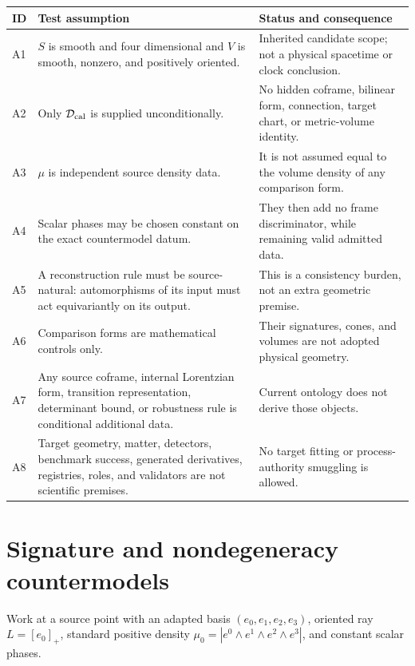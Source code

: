 \documentclass[11pt]{article}
\begin{document}
\begin{longtable}{>{\raggedright\arraybackslash}p{}
                  >{\raggedright\arraybackslash}p{}
                  >{\raggedright\arraybackslash}p{}}
\toprule
ID & Test assumption & Status and consequence\\
\midrule
\endhead
A1 & \(S\) is smooth and four dimensional and \(V\) is smooth, nonzero, and
positively oriented. & Inherited candidate scope; not a physical spacetime or
clock conclusion.\\
A2 & Only \(\mathcal D_{\rm cal}\) is supplied unconditionally. & No hidden
coframe, bilinear form, connection, target chart, or metric-volume identity.\\
A3 & \(\mu\) is independent source density data. & It is not assumed equal to
the volume density of any comparison form.\\
A4 & Scalar phases may be chosen constant on the exact countermodel datum. &
They then add no frame discriminator, while remaining valid admitted data.\\
A5 & A reconstruction rule must be source-natural: automorphisms of its input
must act equivariantly on its output. & This is a consistency burden, not an
extra geometric premise.\\
A6 & Comparison forms are mathematical controls only. & Their signatures,
cones, and volumes are not adopted physical geometry.\\
A7 & Any source coframe, internal Lorentzian form, transition representation,
determinant bound, or robustness rule is conditional additional data. &
Current ontology does not derive those objects.\\
A8 & Target geometry, matter, detectors, benchmark success, generated
derivatives, registries, roles, and validators are not scientific premises. &
No target fitting or process-authority smuggling is allowed.\\
\bottomrule
\end{longtable}

\section{Signature and nondegeneracy countermodels}

Work at a source point with an adapted basis
\((e_0,e_1,e_2,e_3)\), oriented ray \(L=[e_0]_+\), standard positive density
\(\mu_0=|e^0\wedge e^1\wedge e^2\wedge e^3|\), and constant scalar phases.
\end{document}
